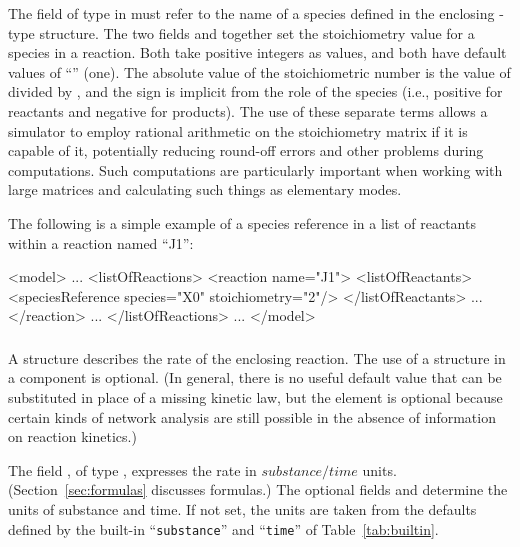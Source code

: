 \documentclass[10pt]{cekarticle}
\newcommand{\vref}[1]{\ref{#1}}
\newcommand{\changed}[1]{\textcolor{BrickRed}{#1}}
\begin{document}
The field \changed{} of type  in
\changed{} must refer to the name of a
\changed{species} defined in the enclosing -type structure.
The two fields  and  together set
the stoichiometry value for a \changed{species} in a reaction.  Both
\changed{take positive integers as values}, and both have default values of
``'' (one).  \changed{The absolute value of the
  stoichiometric number is the value of \attrib{stoichiometry} divided by
  \attrib{denominator}, and the sign is implicit from the role of the
  species (i.e., positive for reactants and negative for products).}  The
use of these separate terms allows a simulator to employ rational
arithmetic on the stoichiometry matrix \changed{if it is capable of it},
potentially reducing round-off errors and other problems during
computations.  Such computations are particularly important when working
with large matrices and calculating such things as elementary modes.

The following is a simple example of a \changed{species} reference in a
list of reactants within a reaction named ``J1'':
\begin{example}
<model>
    ...
    <listOfReactions>
        <reaction name="J1">
            <listOfReactants>
                <\changed{speciesReference} \changed{species}="X0" stoichiometry="2"/>
            </listOfReactants>
            ...
        </reaction>
        ...
    </listOfReactions>
    ...
</model>
\end{example}

\subsubsection{}
\label{subsec:kinetic-law}

A  structure describes the rate of the enclosing
reaction.  The use of a  structure in a 
component is optional.  (\changed{In general, there is no useful default
  value that can be substituted in place of a missing kinetic law, but the
  element is optional because certain kinds of network analysis are still
  possible in the absence of information on reaction kinetics.})

The field , of type , expresses the rate in
$substance/time$ units.  (Section~\ref{sec:formulas} discusses formulas.)
The optional fields  and 
determine the units of substance and time.  If not set, the units are taken
from the defaults defined by the built-in ``\texttt{substance}'' and
``\texttt{time}'' of Table~\vref{tab:builtin}.
\end{document}

